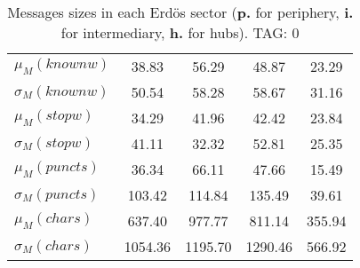 \begin{table}[h!]
\begin{center}
\begin{tabular}{| l || c | c | c | c |}
$\mu_M(knownw)$ & 38.83  & 56.29  & 48.87  & 23.29 \\
$\sigma_M(knownw)$ & 50.54  & 58.28  & 58.67  & 31.16 \\\hline
$\mu_M(stopw)$ & 34.29  & 41.96  & 42.42  & 23.84 \\
$\sigma_M(stopw)$ & 41.11  & 32.32  & 52.81  & 25.35 \\\hline
$\mu_M(puncts)$ & 36.34  & 66.11  & 47.66  & 15.49 \\
$\sigma_M(puncts)$ & 103.42  & 114.84  & 135.49  & 39.61 \\\hline
$\mu_M(chars)$ & 637.40  & 977.77  & 811.14  & 355.94 \\
$\sigma_M(chars)$ & 1054.36  & 1195.70  & 1290.46  & 566.92 \\\hline
\end{tabular}
\caption{Messages sizes in each Erd\"os sector ({{\bf p.}} for periphery, {{\bf i.}} for intermediary, {{\bf h.}} for hubs). TAG: 0}
\end{center}
\end{table}